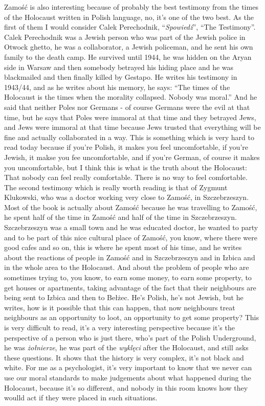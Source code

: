 Zamość is also interesting because of probably the best testimony from the times of the Holocaust written in Polish language, no, it's one of the two best. As the first of them I would consider Calek Perechodnik, ``\textit{Spowiedź}'', ``The Testimony''. Calek Perechodnik was a Jewish person who was part of the Jewish police in Otwock ghetto, he was a collaborator, a Jewish policeman, and he sent his own family to the death camp. He survived until 1944, he was hidden on the Aryan side in Warsaw and then somebody betrayed his hiding place and he was blackmailed and then finally killed by Gestapo. He writes his testimony in 1943/44, and as he writes about his memory, he says: ``The times of the Holocaust is the times when the morality collapsed. Nobody was moral.'' And he said that neither Poles nor Germans - of course Germans were the evil at that time, but he says that Poles were immoral at that time and they betrayed Jews, and Jews were immoral at that time because Jews trusted that everything will be fine and actually collaborated in a way. This is something which is very hard to read today because if you're Polish, it makes you feel uncomfortable, if you're Jewish, it makse you fee uncomfortable, and if you're German, of course it makes you uncomfortable, but I think this is what is the truth about the Holocaust: That nobody can feel really comfortable. There is no way to feel comfortable. The second testimony which is really worth reading is that of Zygmunt Klukowski, who was a doctor working very close to Zamość, in Szczebrzeszyn. Most of the book is actually about Zamość because he was travelling to Zamość, he spent half of the time in Zamość and half of the time in Szczebrzeszyn. Szczebrzeszyn was a small town and he was educated doctor, he wanted to party and to be part of this nice cultural place of Zamość, you know, where there were good cafes and so on, this is where he spent most of his time, and he writes about the reactions of people in Zamość and in Szczebrzeszyn and in Izbica and in the whole area to the Holocaust. And about the problem of people who are sometimes trying to, you know, to earn some money, to earn some property, to get houses or apartments, taking advantage of the fact that their neighbours are being sent to Izbica and then to Bełżec. He's Polish, he's not Jewish, but he writes, how is it possible that this can happen, that now neighbours treat neighbours as an opportunity to loot, an opportunity to get some property? This is very difficult to read, it's a very interesting perspective because it's the perspective of a person who is just there, who's part of the Polish Underground, he was \textit{żołnierze}, he was part of the \textit{wyklęci} after the Holocaust, and still asks these questions. It shows that the history is very complex, it’s not black and white. For me as a psychologist, it’s very important to know that we never can use our moral standards to make judgements about what happened during the Holocaust, because it’s so different, and nobody in this room knows how they woulld act if they were placed in such situations.

